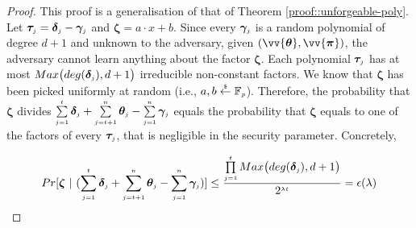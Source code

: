  

\begin{proof}  
This proof is a generalisation of that of Theorem \ref{proof::unforgeable-poly}.  
Let $\bm\tau_{\scriptscriptstyle j}=\bm\delta_{\scriptscriptstyle j}-\bm\gamma_{\scriptscriptstyle j}$ and $\bm\zeta=a\cdot x+b$. Since  every $\bm\gamma_{\scriptscriptstyle j}$ is a random polynomial of degree $d+1$ and unknown to the adversary, given $(\vv{\bm\theta}, \vv{\bm\pi})$,  the adversary cannot learn anything about the factor $\bm\zeta$. Each polynomial $\bm\tau_{\scriptscriptstyle j}$ has at most $Max\big(deg(\bm\delta_{\scriptscriptstyle j}), d+1\big)$ irreducible non-constant factors. 
%
%
We  know that $\bm\zeta$ has been picked uniformly at random (i.e., $a,b
\stackrel{\scriptscriptstyle \$}\leftarrow \mathbb F_{\scriptscriptstyle p}$). Therefore, the probability that $\bm\zeta$ divides $\sum\limits_{\scriptscriptstyle j=1}^{\scriptscriptstyle t}\bm\delta_{\scriptscriptstyle j} + \sum\limits_{\scriptscriptstyle j=t+1}^{\scriptscriptstyle n}\bm\theta_{\scriptscriptstyle j} - \sum\limits_{\scriptscriptstyle j=1}^{\scriptscriptstyle n}\bm\gamma_{\scriptscriptstyle j}$ equals the probability that $\bm\zeta$ equals to one of the factors of  every $\bm\tau_{\scriptscriptstyle j}$, that is negligible in the security parameter. Concretely,


$$Pr[ \bm\zeta \ | \ (\sum\limits_{\scriptscriptstyle j=1}^{\scriptscriptstyle t}\bm\delta_{\scriptscriptstyle j} + \sum\limits_{\scriptscriptstyle j=t+1}^{\scriptscriptstyle n}\bm\theta_{\scriptscriptstyle j} - \sum\limits_{\scriptscriptstyle j=1}^{\scriptscriptstyle n}\bm\gamma_{\scriptscriptstyle j} ) ]\leq  \frac{\prod \limits^{\scriptscriptstyle t}_{\scriptscriptstyle j=1}Max\big(deg(\bm\delta_{\scriptscriptstyle j}), d+1\big)} {2^{\scriptscriptstyle \lambda t}}=\epsilon(\lambda)$$
%
\end{proof} 









